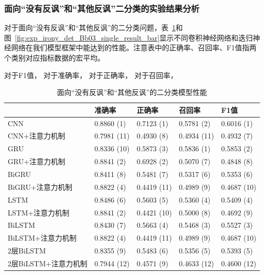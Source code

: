 \subsubsection{面向“没有反讽”和“其他反讽”二分类的实验结果分析}

对于面向“没有反讽”和“其他反讽”的二分类问题，表~\ref{tab:exp_irony_det_Bb03_result}和图~\ref{fig:exp_irony_det_Bb03_single_result_bar}显示不同卷积神经网络和迭归神经网络在我们模型框架中能达到的性能。注意表中的正确率、召回率、F1值指两个类别对应指标数据的宏平均。

对于F1值，
对于准确率，
对于正确率，
对于召回率，

\begin{table}[htb]
  \centering
  \begin{minipage}[t]{\linewidth}
  \caption{面向“没有反讽”和“其他反讽”的二分类模型性能}
  \label{tab:exp_irony_det_Bb03_result}
    \begin{tabularx}{\linewidth}{X|llll}
    \toprule[1.5pt]
    & 准确率 & 正确率 & 召回率 & F1值 \\
    \hline
    CNN & 0.8860 (1) & 0.7123 (1) & 0.5781 (2) & 0.6016 (1) \\ %
    CNN+注意力机制 & 0.7981 (11) & 0.4930 (8) & 0.4934 (11) & 0.4932 (7) \\ %
    \hline
    GRU & 0.8336 (10) & 0.5873 (3) & 0.5836 (1) & 0.5853 (2) \\ %
    GRU+注意力机制 & 0.8841 (2) & 0.6928 (2) & 0.5070 (7) & 0.4848 (8) \\ %
    \hline
    BiGRU & 0.8411 (8) & 0.5481 (7) & 0.5317 (6) & 0.5353 (6) \\ %
    BiGRU+注意力机制 & 0.8822 (4) & 0.4419 (11) & 0.4989 (9) & 0.4687 (10) \\ %
    \hline
    LSTM & 0.8486 (6) & 0.5603 (5) & 0.5360 (4) & 0.5409 (4) \\ %
    LSTM+注意力机制 & 0.8841 (2) & 0.4421 (10) & 0.5000 (8) & 0.4692 (9) \\ %
    \hline
    BiLSTM & 0.8430 (7) & 0.5663 (4) & 0.5468 (3) & 0.5527 (3) \\ %
    BiLSTM+注意力机制 & 0.8822 (4) & 0.4419 (11) & 0.4989 (9) & 0.4687 (10) \\ %
    \hline
    2层BiLSTM & 0.8355 (9) & 0.5483 (6) & 0.5356 (5) & 0.5393 (5) \\ %
    2层BiLSTM+注意力机制 & 0.7944 (12) & 0.4571 (9) & 0.4633 (12) & 0.4600 (12) \\ %
    \bottomrule[1.5pt]
    \end{tabularx}
  \end{minipage}
\end{table}

